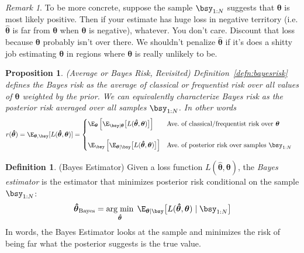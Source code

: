 \documentclass[12pt]{article}
\theoremstyle{plain}
\newtheorem{prop}[thm]{Proposition}
\theoremstyle{definition}
\newtheorem{defn}[thm]{Definition}
\theoremstyle{remark}
\newtheorem*{rmk}{Remark}
\newcommand{\bstheta}{\boldsymbol{\theta}}
\newcommand{\bshattheta}{\boldsymbol{\hat{\theta}}}
\DeclareMathOperator*{\argmin}{arg\;min}
\begin{document}
\begin{rmk}
To be more concrete, suppose the sample $\bsy_{1:N}$ suggests that
$\bstheta$ is most likely positive.  Then if your estimate has huge loss
in negative territory (i.e. $\bshattheta$ is far from $\bstheta$ when
$\bstheta$ is negative), whatever. You don't care. Discount that loss
because $\bstheta$ probably isn't over there. We shouldn't penalize
$\bshattheta$ if it's does a shitty job estimating $\bstheta$ in regions
where $\bstheta$ is really unlikely to be.
\end{rmk}

\begin{prop}\emph{(Average or Bayes Risk, Revisited)}
\label{prop:bayesrisk}
Definition~\ref{defn:bayesrisk} defines the Bayes risk as the average of
classical or frequentist risk over all values of $\bstheta$ weighted by
the prior. We can equivalently characterize Bayes risk as the posterior
risk averaged over all samples $\bsy_{1:N}$. In other words
\begin{align*}
  r(\bshattheta)
  &= \E_{\bstheta,\bsy}[L(\bshattheta,\bstheta)]
  =
  \begin{cases}
    \E_{\bstheta}\left[
      \E_{\bsy|\bstheta}\big[
        L(\bshattheta,\bstheta)
      \big]
    \right]
    &\text{Ave.\ of classical/frequentist risk over $\bstheta$}
    \\
    \\
    \E_{\bsy}\left[
      \E_{\bstheta|\bsy}\big[L(\bshattheta,\bstheta)\big]
    \right]
    &\text{Ave.\ of posterior risk over samples $\bsy_{1:N}$} \\
  \end{cases}
\end{align*}
\end{prop}

\begin{defn}(Bayes Estimator)
\label{defn:bayesest}
Given a loss function $L(\bshattheta,\bstheta)$, the
\emph{Bayes estimator} is the estimator that minimizes posterior risk
conditional on the sample $\bsy_{1:N}$:
\begin{align*}
  \bshattheta_{\text{Bayes}}
  = \argmin_{\bshattheta} \;
  \E_{\bstheta|\bsy}\big[
    L(\bshattheta,\bstheta)\;|\;\bsy_{1:N}
  \big]
\end{align*}
In words, the Bayes Estimator looks at the sample and minimizes the risk
of being far what the posterior suggests is the true value.
\end{defn}
\end{document}
